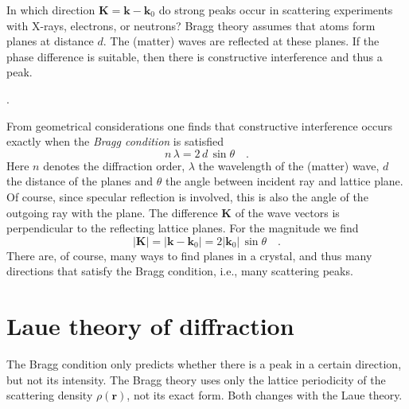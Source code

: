 In which direction $\mathbf{K} = \mathbf{k} - \mathbf{k}_0$ do strong peaks occur in scattering experiments with X-rays, electrons, or neutrons? Bragg theory assumes that atoms form planes at distance $d$. The (matter) waves are reflected at these planes. If the phase difference is suitable, then there is constructive interference and thus a peak.


\begin{marginfigure}

\caption{Phase difference in reflection at two planes}.
\end{marginfigure}


From geometrical considerations one finds that constructive interference occurs exactly when the \emph{Bragg condition} is satisfied
\begin{equation}
n \, \lambda = 2 \, d \, \sin \theta \quad .
\end{equation}
Here $n$ denotes the diffraction order, $\lambda$ the wavelength of the (matter) wave, $d$ the distance of the planes and $\theta$ the angle between incident ray and lattice plane. Of course, since specular reflection is involved, this is also the angle of the outgoing ray with the plane. The difference 
$\mathbf{K}$ of the wave vectors is perpendicular to the reflecting lattice planes. For the magnitude we find
\begin{equation}
|\mathbf{K}| = |\mathbf{k} - \mathbf{k}_0| = 2 | \mathbf{k}_0| \, \sin \theta \quad .
\label{eq:4_def_k_sin_theta}
\end{equation}
There are, of course, many ways to find planes in a crystal, and thus many directions that satisfy the Bragg condition, i.e., many scattering peaks.
 
 
\section{Laue theory of diffraction} 
 
The Bragg condition only predicts whether there is a peak in a certain direction, but not its intensity. The Bragg theory uses only the lattice periodicity of the scattering density $\rho( \mathbf{r})$, not its exact form. Both changes with the Laue theory.

